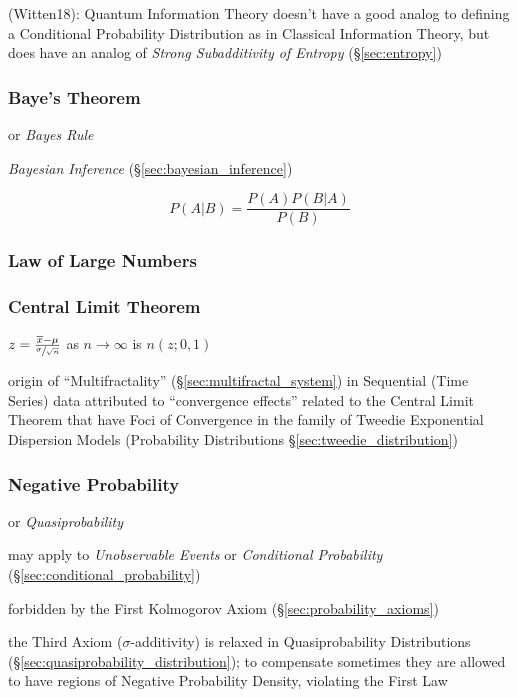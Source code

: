 (Witten18): Quantum Information Theory doesn't have a good analog to defining a
Conditional Probability Distribution as in Classical Information Theory, but
does have an analog of \emph{Strong Subadditivity of Entropy}
(\S\ref{sec:entropy})



\subsubsection{Baye's Theorem}\label{sec:bayes_theorem}

or \emph{Bayes Rule}

\emph{Bayesian Inference} (\S\ref{sec:bayesian_inference})

\[
  P(A|B) = \frac{P(A)P(B|A)}{P(B)}
\]



\subsubsection{Law of Large Numbers}\label{sec:large_numbers}

\subsubsection{Central Limit Theorem}\label{sec:central_limit}

$z = \frac{\overline{x} - \mu}{\sfrac{\sigma}{\sqrt{n}}}$ as $n
\rightarrow \infty$ is $n(z; 0,1)$ %

\fist origin of ``Multifractality'' (\S\ref{sec:multifractal_system}) in
Sequential (Time Series) data attributed to ``convergence effects'' related to
the Central Limit Theorem that have Foci of Convergence in the family of Tweedie
Exponential Dispersion Models (Probability Distributions
\S\ref{sec:tweedie_distribution})



\subsubsection{Negative Probability}\label{sec:negative_probability}

or \emph{Quasiprobability}

may apply to \emph{Unobservable Events} or \emph{Conditional Probability}
(\S\ref{sec:conditional_probability})

forbidden by the First Kolmogorov Axiom (\S\ref{sec:probability_axioms})

the Third Axiom ($\sigma$-additivity) is relaxed in Quasiprobability
Distributions (\S\ref{sec:quasiprobability_distribution}); to compensate
sometimes they are allowed to have regions of Negative Probability Density,
violating the First Law

